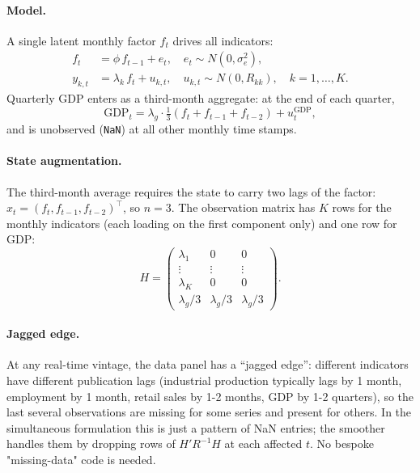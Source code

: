 \documentclass[11pt]{article}
\begin{document}
\paragraph{Model.}  A single latent monthly factor $f_t$ drives all
indicators:
\begin{align}
f_t&=\phi\,f_{t-1}+e_t,\quad e_t\sim N(0,\sigma_e^2),\\
y_{k,t}&=\lambda_k\,f_t+u_{k,t},\quad u_{k,t}\sim N(0,R_{kk}),\quad k=1,\ldots,K.
\end{align}
Quarterly GDP enters as a third-month aggregate: at the end of each
quarter,
\begin{equation}
\text{GDP}_t=\lambda_g\cdot\tfrac13(f_t+f_{t-1}+f_{t-2})+u^{\text{GDP}}_t,
\end{equation}
and is unobserved (\texttt{NaN}) at all other monthly time stamps.

\paragraph{State augmentation.}  The third-month average requires the
state to carry two lags of the factor:
$x_t=(f_t,f_{t-1},f_{t-2})^\top$, so $n=3$.  The observation matrix has
$K$ rows for the monthly indicators (each loading on the first
component only) and one row for GDP:
\begin{equation}
H=\begin{pmatrix}
\lambda_1 & 0 & 0\\
\vdots & \vdots & \vdots\\
\lambda_K & 0 & 0\\
\lambda_g/3 & \lambda_g/3 & \lambda_g/3
\end{pmatrix}.
\end{equation}

\paragraph{Jagged edge.}  At any real-time vintage, the data panel
has a ``jagged edge'': different indicators have different
publication lags (industrial production typically lags by 1 month,
employment by 1 month, retail sales by 1-2 months, GDP by 1-2
quarters), so the last several observations are missing for some
series and present for others.  In the simultaneous formulation this
is just a pattern of NaN entries; the smoother handles them by
dropping rows of $H'R^{-1}H$ at each affected $t$.  No bespoke
"missing-data" code is needed.
\end{document}
